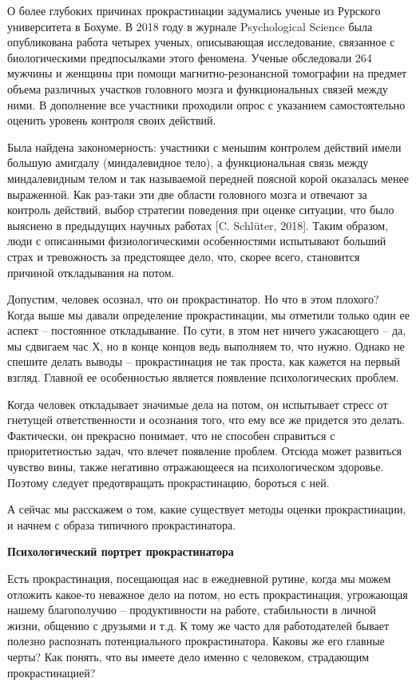 О более глубоких причинах прокрастинации задумались ученые из Рурского университета в Бохуме. В 2018 году в журнале Psychological Science была опубликована работа четырех ученых, описывающая исследование, связанное с биологическими предпосылками этого феномена. Ученые обследовали 264 мужчины и женщины при помощи магнитно-резонансной томографии на предмет объема различных участков головного мозга и функциональных связей между ними. В дополнение все участники проходили опрос с указанием самостоятельно оценить уровень контроля своих действий.

Была найдена закономерность: участники с меньшим контролем действий имели большую амигдалу (миндалевидное тело), а функциональная связь между миндалевидным телом и так называемой передней поясной корой оказалась менее выраженной. Как раз-таки эти две области головного мозга и отвечают за контроль действий, выбор стратегии поведения при оценке ситуации, что было выяснено в предыдущих научных работах [C. Schlüter, 2018]. Таким образом, люди с описанными физиологическими особенностями испытывают больший страх и тревожность за предстоящее дело, что, скорее всего, становится причиной откладывания на потом.

Допустим, человек осознал, что он прокрастинатор. Но что в этом плохого? Когда выше мы давали определение прокрастинации, мы отметили только один ее аспект – постоянное откладывание. По сути, в этом нет ничего ужасающего – да, мы сдвигаем час Х, но в конце концов ведь выполняем то, что нужно. Однако не спешите делать выводы – прокрастинация не так проста, как кажется на первый взгляд. Главной ее особенностью является появление психологических проблем.

Когда человек откладывает значимые дела на потом, он испытывает стресс от гнетущей ответственности и осознания того, что ему все же придется это делать. Фактически, он прекрасно понимает, что не способен справиться с приоритетностью задач, что влечет появление проблем. Отсюда может развиться чувство вины, также негативно отражающееся на психологическом здоровье. Поэтому следует предотвращать прокрастинацию, бороться с ней.

А сейчас мы расскажем о том, какие существует методы оценки прокрастинации, и начнем с образа типичного прокрастинатора.

\textbf{Психологический портрет прокрастинатора}

Есть прокрастинация, посещающая нас в ежедневной рутине, когда мы можем отложить какое-то неважное дело на потом, но есть прокрастинация, угрожающая нашему благополучию – продуктивности на работе, стабильности в личной жизни, общению с друзьями и т.д. К тому же часто для работодателей бывает полезно распознать потенциального прокрастинатора. Каковы же его главные черты? Как понять, что вы имеете дело именно с человеком, страдающим прокрастинацией?


